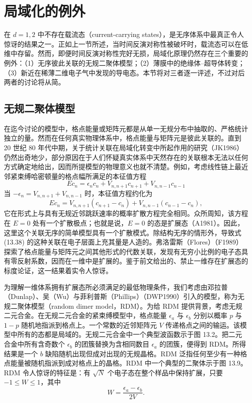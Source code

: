 \section{局域化的例外}

在 $d=1,2$ 中不存在载流态（current-carrying states），是无序体系中最真正令人惊讶的结果之一。正如上一节所述，当时间反演对称性被破坏时，载流态可以在低维中存留。然而，即便时间反演对称性完好无损，局域化原理仍然存在三个重要的例外：（1）无序彼此关联的无规二聚体模型；（2）薄膜中的绝缘体--超导体转变；（3）新近在稀薄二维电子气中发现的导电态。本节将对三者逐一评述，不过对后两者的讨论将从简。

\subsection{无规二聚体模型}

在迄今讨论的模型中，格点能量或矩阵元都是从单一无规分布中抽取的、严格统计独立的量。然而在任何真实物理体系中，格点能量与矩阵元是彼此关联的。直到 20 世纪 80 年代中期，关于统计关联在局域化转变中所起作用的研究（JK1986）仍然出奇地少，部分原因在于人们怀疑真实体系中天然存在的关联根本无法以任何方式确定地给出，因而所提模型的物理意义也就不清楚。例如，考虑线性链上最近邻紧束缚哈密顿量的格点幅所满足的本征值方程
\begin{equation*}
E c_{n}=\epsilon_{n}c_{n}+V_{n,n+1}c_{n+1}+V_{n,n-1}c_{n-1}\tag{13.37}
\end{equation*}
当 $-\epsilon_{n}=V_{n,n+1}+V_{n,n-1}$ 时，本征值方程约化为
\begin{equation*}
E c_{n}=V_{n,n+1}(c_{n+1}-c_{n})+V_{n,n-1}(c_{n-1}-c_{n}),\tag{13.38}
\end{equation*}
它在形式上与具有无规近邻跳跃速率的概率扩散方程完全相同。众所周知，该方程在 $E=0$ 处有一个扩散极点；也就是说，$E=0$ 的态是扩展态（A1981）。因此，这里这个关联无序的简单模型具有一个扩散模式。除结构无序的情形外，导致式 (13.38) 的这种关联在电子层面上充其量是人造的。弗洛雷斯（Flores）（F1989）探索了格点能量与矩阵元之间其他形式的代数关联，发现有无穷小比例的电子态具有零反射系数，因而在一维中是扩展的。鉴于前文给出的、禁止一维存在扩展态的标度论证，这一结果着实令人惊讶。

为理解一维体系拥有扩展态所必须满足的最低物理条件，我们考虑由邓拉普（Dunlap）、吴（Wu）与菲利普斯（Phillips）（DWP1990）引入的模型，称为无规二聚体模型（random dimer model，RDM）。为给 RDM 提供背景，考虑无规二元合金。在无规二元合金的紧束缚模型中，格点能量 $\epsilon_{a}$ 与 $\epsilon_{b}$ 分别以概率 $p$ 与 $1-p$ 随机地指派到格点上。一个常数的近邻矩阵元 $V$ 传递格点之间的输运。该模型中所有的态都是局域的。无规二元合金中一个典型波函数示于图 13.2。把二元合金中所有含奇数个 $\epsilon_{b}$ 的团簇替换为含相同数目 $\epsilon_{a}$ 的团簇，便得到 RDM。所得结果是一个 $b$ 缺陷随机出现但成对出现的无规晶格。RDM 泛指任何至少有一种格点能量被随机指派到成对格点上的晶格。RDM 中一个典型的二聚体示于图 13.9。RDM 令人惊讶的特征是：有 $\sqrt{N}$ 个电子态在整个样品中保持扩展，只要 $-1\le W\le 1$，其中
\begin{equation*}
W=\frac{\epsilon_{a}-\epsilon_{b}}{2V}.\tag{13.39}
\end{equation*}

